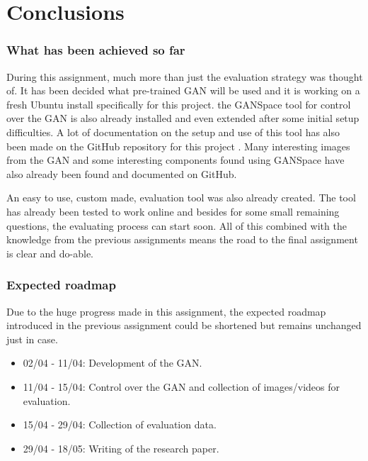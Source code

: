 \part{Conclusions}
\label{part:conclusions}

\section{What has been achieved so far}
\label{sec:issues}

During this assignment, much more than just the evaluation strategy was thought of.
It has been decided what pre-trained GAN will be used and it is working on a fresh Ubuntu install specifically for this project.
the GANSpace tool for control over the GAN is also already installed and even extended after some initial setup difficulties.
A lot of documentation on the setup and use of this tool has also been made on the GitHub repository for this project \citep{github_project}. 
Many interesting images from the GAN and some interesting components found using GANSpace have also already been found and documented on GitHub.

An easy to use, custom made, evaluation tool was also already created.
The tool has already been tested to work online and besides for some small remaining questions, the evaluating process can start soon.
All of this combined with the knowledge from the previous assignments means the road to the final assignment is clear and do-able.


\section{Expected roadmap}
\label{sec:roadmap}

Due to the huge progress made in this assignment, the expected roadmap introduced in the previous assignment could be shortened but remains unchanged just in case.
\begin{itemize}
    \item 02/04 - 11/04: Development of the GAN.
    \item 11/04 - 15/04: Control over the GAN and collection of images/videos for evaluation.
    \item 15/04 - 29/04: Collection of evaluation data.
    \item 29/04 - 18/05: Writing of the research paper.
\end{itemize}